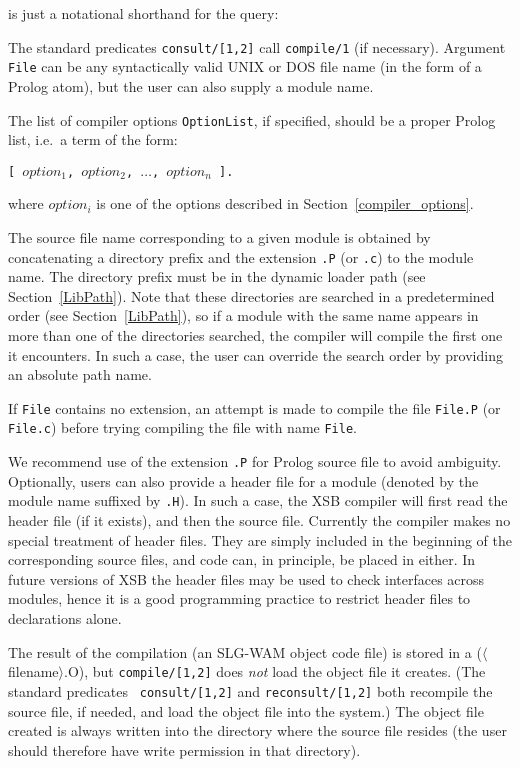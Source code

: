 
\noindent
is just a notational shorthand for the query:


The standard predicates {\tt consult/[1,2]} call {\tt compile/1} (if
necessary).  Argument {\tt File} can be any syntactically valid UNIX
or DOS file name (in the form of a Prolog atom), but the user can also
supply a module name.

The list of compiler options {\tt OptionList}, if specified, 
should be a proper Prolog list, i.e.\ a term of the form:
\begin{center}
	{\tt [ $option_1$, $option_2$, $\ldots$, $option_n$ ].}
\end{center}
where $option_i$ is one of the options described in
Section~\ref{compiler_options}.

The source file name corresponding to a given module is obtained by 
concatenating a directory prefix and the extension {\tt .P} (or {\tt .c}) 
to the module name.  The directory prefix must be in the
dynamic loader path (see Section~\ref{LibPath}).
Note that these directories are searched in a predetermined
order (see Section~\ref{LibPath}), so if a module with the same name
appears in more than one of the directories searched, the compiler 
will compile the first one it encounters.  In such a case, the user can 
override the search order by providing an absolute path name.

If {\tt File} contains no extension, an attempt is made to compile the 
file {\tt File.P} (or {\tt File.c}) before trying compiling the file 
with name {\tt File}.  

We recommend use of the extension {\tt .P} for Prolog source file to
avoid ambiguity.  Optionally, users can also provide a header file for
a module (denoted by the module name suffixed by {\tt .H}).  In such a
case, the XSB compiler will first read the header file (if it
exists), and then the source file.  Currently the compiler makes no
special treatment of header files.  They are simply included in the
beginning of the corresponding source files, and code can, in
principle, be placed in either.  In future versions of XSB the
header files may be used to check interfaces across modules, hence it
is a good programming practice to restrict header files to
declarations alone.
 
The result of the compilation (an SLG-WAM object code file) is stored
in a ($\langle$filename$\rangle$.O), but {\tt compile/[1,2]} does {\em
not\/} load the object file it creates.  (The standard predicates {\tt
consult/[1,2]} and {\tt reconsult/[1,2]} both recompile the source
file, if needed, and load the object file into the system.)  The
object file created is always written into the directory where the
source file resides (the user should therefore have write permission
in that directory).
 

